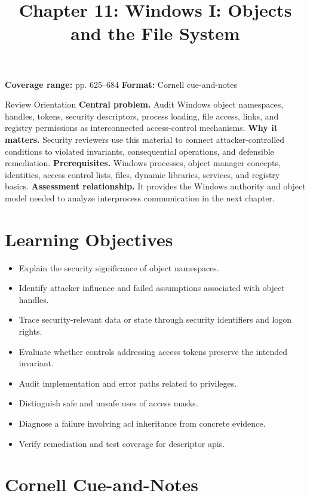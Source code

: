 \documentclass[11pt,letterpaper]{article}
\title{Chapter 11: Windows I: Objects and the File System}
\author{}
\date{}
\begin{document}
\maketitle

\begin{center}
\small\color{Meta}\textbf{Coverage range:} pp. 625--684 \quad\textbullet\quad \textbf{Format:} Cornell cue-and-notes
\end{center}
\vspace{0.25em}
\begin{CornellOverviewBox}{Review Orientation}
\textbf{Central problem.} Audit Windows object namespaces, handles, tokens, security descriptors, process loading, file access, links, and registry permissions as interconnected access-control mechanisms.
\textbf{Why it matters.} Security reviewers use this material to connect attacker-controlled conditions to violated invariants, consequential operations, and defensible remediation.
\textbf{Prerequisites.} Windows processes, object manager concepts, identities, access control lists, files, dynamic libraries, services, and registry basics.
\textbf{Assessment relationship.} It provides the Windows authority and object model needed to analyze interprocess communication in the next chapter.
\end{CornellOverviewBox}
\section{Learning Objectives}
\begin{itemize}
\item Explain the security significance of object namespaces.
\item Identify attacker influence and failed assumptions associated with object handles.
\item Trace security-relevant data or state through security identifiers and logon rights.
\item Evaluate whether controls addressing access tokens preserve the intended invariant.
\item Audit implementation and error paths related to privileges.
\item Distinguish safe and unsafe uses of access masks.
\item Diagnose a failure involving acl inheritance from concrete evidence.
\item Verify remediation and test coverage for descriptor apis.
\end{itemize}
\section{Cornell Cue-and-Notes}
\end{document}
